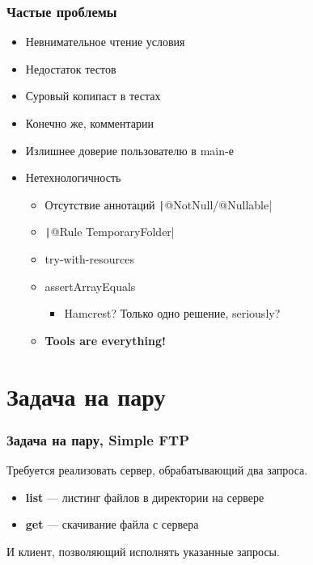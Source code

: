 \documentclass[xetex,mathserif,serif]{beamer}
\begin{document}
	\begin{frame}
		\frametitle{Частые проблемы}
		\begin{itemize}
			\item Невнимательное чтение условия
			\item Недостаток тестов
			\item Суровый копипаст в тестах
			\item Конечно же, комментарии
			\item Излишнее доверие пользователю в main-е
			\item Нетехнологичность
			\begin{itemize}
				\item Отсутствие аннотаций \texttt|@NotNull/@Nullable|
				\item \texttt|@Rule TemporaryFolder|
				\item try-with-resources
				\item assertArrayEquals
				\begin{itemize}
					\item Hamcrest? Только одно решение, seriously?
				\end{itemize}
				\item \textbf{Tools are everything!}
			\end{itemize}
		\end{itemize}
	\end{frame}

	\section{Задача на пару}

	\begin{frame}
		\frametitle{Задача на пару, Simple FTP}
		Требуется реализовать сервер, обрабатывающий два запроса.
		\begin{itemize}
			\item \textbf{list} --- листинг файлов в директории на сервере
			\item \textbf{get} --- скачивание файла с сервера
		\end{itemize}
		И клиент, позволяющий исполнять указанные запросы.
	\end{frame}
\end{document}
